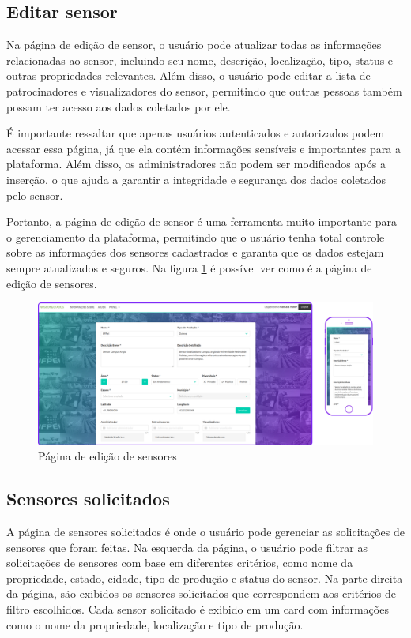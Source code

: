 \documentclass[tcc,capa]{texufpel}
\begin{document}
\subsection{Editar sensor}
Na página de edição de sensor, o usuário pode atualizar todas as informações relacionadas ao sensor, incluindo seu nome, descrição, localização, tipo, status e outras propriedades relevantes. Além disso, o usuário pode editar a lista de patrocinadores e visualizadores do sensor, permitindo que outras pessoas também possam ter acesso aos dados coletados por ele.

É importante ressaltar que apenas usuários autenticados e autorizados podem acessar essa página, já que ela contém informações sensíveis e importantes para a plataforma. Além disso, os administradores não podem ser modificados após a inserção, o que ajuda a garantir a integridade e segurança dos dados coletados pelo sensor.

Portanto, a página de edição de sensor é uma ferramenta muito importante para o gerenciamento da plataforma, permitindo que o usuário tenha total controle sobre as informações dos sensores cadastrados e garanta que os dados estejam sempre atualizados e seguros. Na figura \ref{editsensor} é possível ver como é a página de edição de sensores.

\begin{figure}[htbp]
  \centering \includegraphics[scale=.2]{assets/editarsensor.png}
  \caption{Página de edição de sensores}
  \label{editsensor}
\end{figure}
\newpage
\subsection{Sensores solicitados}
A página de sensores solicitados é onde o usuário pode gerenciar as solicitações de sensores que foram feitas. Na esquerda da página, o usuário pode filtrar as solicitações de sensores com base em diferentes critérios, como nome da propriedade, estado, cidade, tipo de produção e status do sensor. Na parte direita da página, são exibidos os sensores solicitados que correspondem aos critérios de filtro escolhidos. Cada sensor solicitado é exibido em um card com informações como o nome da propriedade, localização e tipo de produção.
\end{document}
